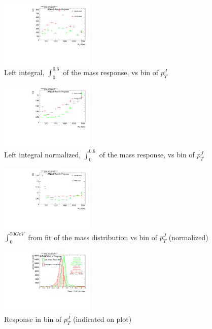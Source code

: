 \begin{figure}

\includegraphics[width=0.4\textwidth]{appendixB/mTAS_W_calibmCal_20:07:01-03-11-2016/73graph_h_JetRatio_mJ12CALO_I50ResponseMvsTA.pdf}
\caption{Left integral, $\int_{0}^{0.6} $ of the mass response, vs bin of  $p_{T}^{J}$}

\end{figure}

\begin{figure}

\includegraphics[width=0.4\textwidth]{appendixB/mTAS_W_calibmCal_20:07:01-03-11-2016/74graph_h_JetRatio_mJ12CALO_I50ResponseMvsTAnorm.pdf}
\caption{Left integral normalized, $\int_{0}^{0.6} $ of the mass response, vs bin of  $p_{T}^{J}$}

\end{figure}

\begin{figure}

\includegraphics[width=0.4\textwidth]{appendixB/mTAS_W_calibmCal_20:07:01-03-11-2016/7graph_h_FatJet_ptJ12m_I50MvsTA.pdf}
\caption{$\int_{0}^{50 GeV}$ from fit of the mass distribution vs bin of $p_{T}^{J}$ (normalized)}

\end{figure}

\begin{figure}

\includegraphics[width=0.4\textwidth]{appendixB/mTAS_W_calibmCal_20:07:01-03-11-2016/8ResponsePTJ_h_JetRatio_mJ01CALO.pdf}
\caption{Response in bin of  $p_{T}^{J}$ (indicated on plot)} 

\end{figure}

